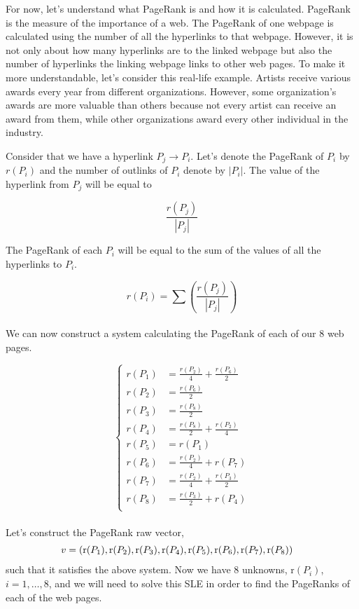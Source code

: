 \documentclass{article}
\begin{document}
For now, let’s understand what PageRank is and how it is calculated. PageRank is the measure of the importance of a web. The PageRank of one webpage is calculated using the number of all the hyperlinks to that webpage. However, it is not only about how many hyperlinks are to the linked webpage but also the number of hyperlinks the linking webpage links to other web pages. To make it more understandable, let’s consider this real-life example. Artists receive various awards every year from different organizations. However, some organization’s awards are more valuable than others because not every artist can receive an award from them, while other organizations award every other individual in the industry.

Consider that we have a hyperlink \( P_j \to P_i \). 
Let’s denote the PageRank of \( P_i \) by \( r(P_i) \) and the number of outlinks of \( P_i \) denote by \( |P_i| \).
The value of the hyperlink from \( P_j \) will be equal to 

\[ \frac{r(P_j)}{|P_j|} \]

The PageRank of each \( P_i \) will be equal to the sum of the values of all the hyperlinks to \( P_i \).

\[ r(P_i) = \sum \left( \frac{r(P_j)}{|P_j|} \right) \]
\\

We can now construct a system calculating the PageRank of each of our 8 web pages.


\[
\begin{cases}
r(P_1) &= \frac{r(P_2)}{4} + \frac{r(P_6)}{2} \\
r(P_2) &= \frac{r(P_6)}{2} \\
r(P_3) &= \frac{r(P_8)}{2} \\
r(P_4) &= \frac{r(P_8)}{2} + \frac{r(P_2)}{4} \\
r(P_5) &= r(P_1) \\
r(P_6) &= \frac{r(P_2)}{4} + r(P_7) \\
r(P_7) &= \frac{r(P_2)}{4} + \frac{r(P_3)}{2} \\
r(P_8) &= \frac{r(P_3)}{2} + r(P_4) \\
\end{cases}
\]
\\

Let’s construct the PageRank raw vector, 
\[
v = (\text{r}(P_1), \text{r}(P_2), \text{r}(P_3), \text{r}(P_4), \text{r}(P_5), \\
\begin{aligned}
 & \text{r}(P_6), \text{r}(P_7), \text{r}(P_8))
\end{aligned}
\] 
such that it satisfies the above system. Now we have 8 unknowns, \( \text{r}(P_i) \), \( i = 1, \ldots, 8 \), and we will need to solve this SLE in order to find the PageRanks of each of the web pages.
\end{document}
